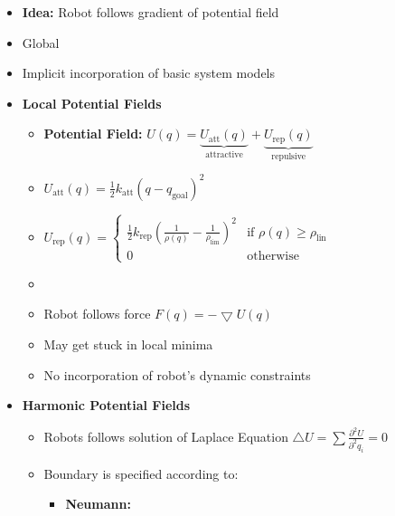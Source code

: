 \documentclass[a4paper]{article}
\newcommand{\icon}{\item[-]}
\newcommand{\ides}[1]{\item \textbf{#1}}
\begin{document}
\begin{itemize}
    \ides{Idea:} Robot follows gradient of potential field
    \item Global
    \item Implicit incorporation of basic system models
    \ides{Local Potential Fields}
        \begin{itemize}
            \ides{Potential Field:} $U(q) = \underbrace{U_{\text{att}}(q)}_{\text{attractive}} + \underbrace{U_{\text{rep}}(q)}_{\text{repulsive}}$
            \item $U_{\text{att}}(q) = \frac{1}{2} k_{\text{att}} (q - q_{\text{goal}})^2$
            \item $U_{\text{rep}}(q) =
\begin{cases}
    \frac{1}{2} k_{\text{rep}}(\frac{1}{\rho(q)} - \frac{1}{\rho_{\text{lim}}})^2 & \text{if } \rho(q) \ge \rho_{\text{lin}}\\
    0 & \text{otherwise}
\end{cases}$
            \item
            \item Robot follows force $F(q) = -\bigtriangledown U(q)$
            \icon May get stuck in local minima
            \icon No incorporation of robot's dynamic constraints
        \end{itemize}
    \ides{Harmonic Potential Fields}
        \begin{itemize}
            \item Robots follows solution of Laplace Equation $\triangle U = \sum \frac{\partial^2 U}{\partial^2 q_i} = 0$
            \item Boundary is specified according to:
                \begin{itemize}
                    \ides{Neumann:}
\end{itemize}
\end{itemize}
\end{itemize}
\end{document}
